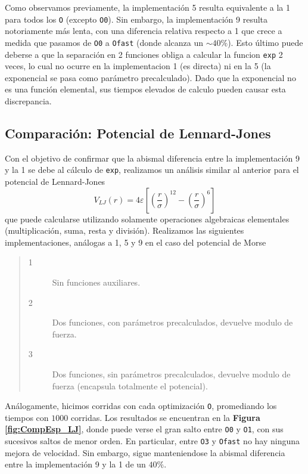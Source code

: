Como observamos previamente, la implementación 5 resulta equivalente a la 1 para todos los \texttt{O} (excepto \texttt{O0}). 
Sin embargo, la implementación 9 resulta notoriamente más lenta, con una diferencia relativa respecto a 1 que crece a medida que pasamos de \texttt{O0} a \texttt{Ofast} (donde alcanza un $\sim40\%$). 
Esto último puede deberse a que la separación en 2 funciones obliga a calcular la funcion \texttt{exp} 2  veces, lo cual no ocurre en la implementacion 1 (es directa) ni en la 5 (la exponencial se
pasa como parámetro precalculado). 
Dado que la exponencial no es una función elemental, sus tiempos elevados de calculo pueden causar esta discrepancia.

\subsection{Comparación: Potencial de Lennard-Jones}

Con el objetivo de confirmar que la abismal diferencia entre la implementación 9 y la 1 se debe al cálculo de \texttt{exp}, realizamos un análisis similar al anterior para el potencial de Lennard-Jones 
\[ V_{LJ} (r) =  4\varepsilon \left[ \left(\frac{r}{\sigma}\right)^{12} -\left(\frac{r}{\sigma}\right)^{6} \right] \]
que puede calcularse utilizando solamente operaciones algebraicas elementales (multiplicación, suma, resta y división). 
Realizamos las siguientes implementaciones, análogas a 1, 5 y 9 en el caso del potencial de Morse
	
\begin{quote}
\begin{description}
\item[1] Sin funciones auxiliares.
\item[2] Dos funciones, con parámetros precalculados, devuelve modulo de fuerza.
\item[3] Dos funciones, sin parámetros precalculados, devuelve modulo de fuerza (encapsula totalmente el potencial).
\end{description}
\end{quote}

Análogamente, hicimos corridas con cada optimización \texttt{O}, promediando los tiempos con $1000$ corridas. 
Los resultados se encuentran en la \textbf{Figura \ref{fig:CompEsp_LJ}}, donde puede verse el gran salto entre \texttt{O0} y \texttt{O1}, con sus sucesivos saltos de menor orden. 
En particular, entre \texttt{O3} y \texttt{Ofast} no hay ninguna mejora de velocidad. 
Sin embargo, sigue manteniendose la abismal diferencia entre la implementación 9 y la 1 de un $40\%$.


